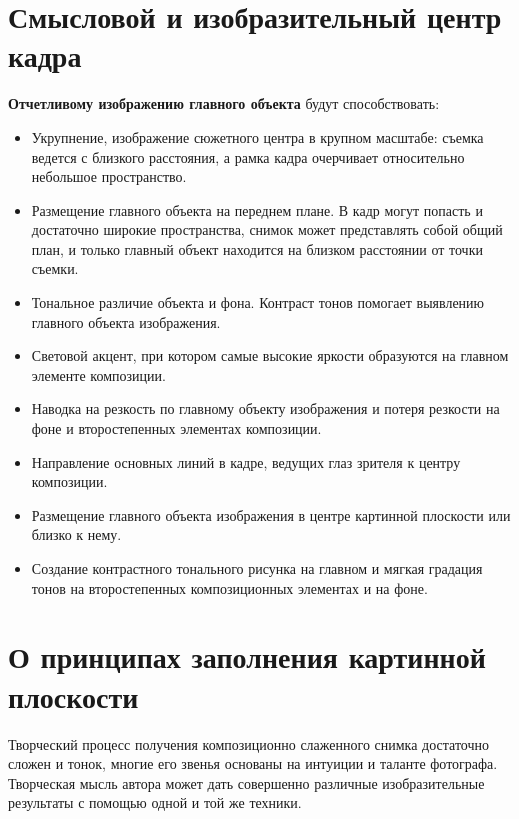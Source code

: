 \documentclass{article}
\begin{document}
\section{Смысловой и изобразительный центр кадра}
\textbf{Отчетливому изображению главного объекта} будут способствовать:
\begin{itemize}
\item Укрупнение, изображение сюжетного центра в крупном масштабе: съемка ведется с близкого расстояния, а рамка кадра очерчивает относительно небольшое пространство.
\item Размещение главного объекта на переднем плане. В кадр могут попасть и достаточно широкие пространства, снимок может представлять собой общий план, и только главный объект находится на близком расстоянии от точки съемки.
\item Тональное различие объекта и фона. Контраст тонов помогает выявлению главного объекта изображения.
\item Световой акцент, при котором самые высокие яркости образуются на главном элементе композиции.
\item Наводка на резкость по главному объекту изображения и потеря резкости на фоне и второстепенных элементах композиции.
\item Направление основных линий в кадре, ведущих глаз зрителя к центру композиции.
\item Размещение главного объекта изображения в центре картинной плоскости или близко к нему.
\item Создание контрастного тонального рисунка на главном и мягкая градация тонов на второстепенных композиционных элементах и на фоне.
\end{itemize}

\section{О принципах заполнения картинной плоскости}
Творческий процесс получения композиционно слаженного снимка достаточно сложен и тонок, многие его звенья основаны на интуиции и таланте фотографа. Творческая мысль автора может дать совершенно различные изобразительные результаты с помощью одной и той же техники.
\end{document}
